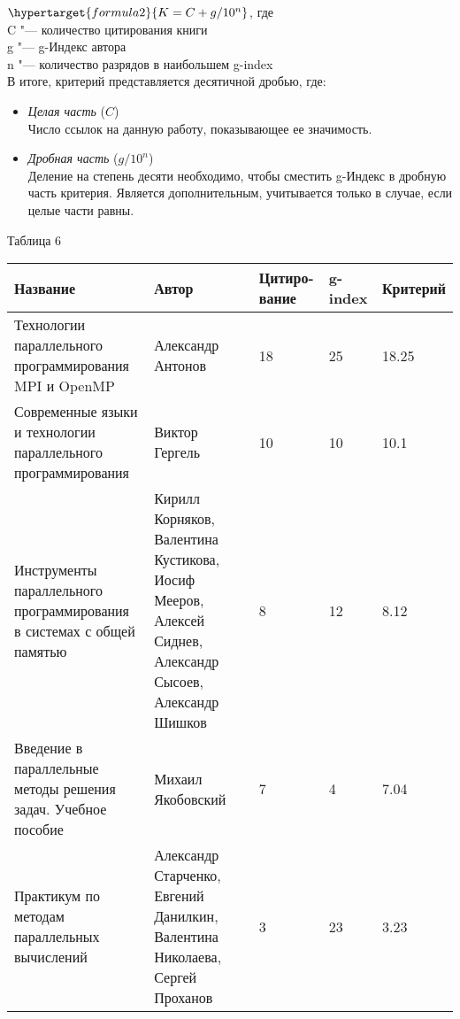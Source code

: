 \documentclass{article}
\begin{document}
			$ \hypertarget{formula2}{K = C + g / 10^n} $, где \\
			C  "---  количество цитирования книги \\
			g "--- g-Индекс автора\\
			n "--- количество разрядов в наибольшем g-index \\			
			В итоге, критерий представляется десятичной дробью, где: 
				\begin{itemize}
					\item \textit{Целая часть} ($C$)\\
						Число ссылок на данную работу, показывающее ее значимость.
					\item \textit{Дробная часть} ($g / 10^n$)\\
						Деление на степень десяти необходимо, чтобы сместить g-Индекс в дробную часть критерия. Является дополнительным, учитывается только в случае, если целые части равны.
				\end{itemize}
			\begin{flushleft}
				Таблица 6
				\begin{longtable}{|p{6cm}|p{4cm}|p{1.8cm}|p{1.55cm}|p{2cm}|}
\hline
Название & Автор & Цитиро-вание & g-index & Критерий \\\hline

Технологии параллельного программирования MPI и OpenMP &
Александр Антонов & 18 & 25 & 18.25\\\hline 

Современные языки и технологии параллельного программирования &
Виктор Гергель & 10 & 10 & 10.1\\\hline

Инструменты параллельного программирования в системах с общей памятью &
Кирилл Корняков, Валентина Кустикова, Иосиф Мееров, Алексей Сиднев, Александр Сысоев, Александр Шишков & 8 & 12 & 8.12\\\hline

Введение в параллельные методы решения задач. Учебное пособие &
Михаил Якобовский & 7 & 4 & 7.04\\\hline

Практикум по методам параллельных вычислений &
Александр Старченко, Евгений Данилкин, Валентина Николаева, Сергей Проханов & 3 & 23 & 3.23\\\hline

				\end{longtable}
\newpage	
			\end{flushleft}
\newpage
\end{document}
